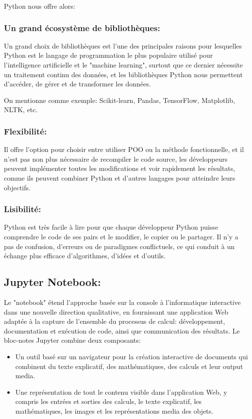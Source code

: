 Python nous offre alors:
\subsubsection{Un grand écosystème de bibliothèques:}
Un grand choix de bibliothèques est l'une des principales raisons pour lesquelles Python est le langage de programmation le plus populaire utilisé pour l'intelligence artificielle et le "machine learning", surtout que ce dernier nécessite un traitement continu des données, et les bibliothèques Python nous permettent d'accéder, de gérer et de transformer les données.

On mentionne comme exemple: Scikit-learn, Pandas, TensorFlow, Matplotlib, NLTK, etc.

\subsubsection{Flexibilité:}
Il offre l'option pour choisir entre utiliser POO ou la méthode fonctionnelle, et il n'est pas non plus nécessaire de recompiler le code source, les développeurs peuvent implémenter toutes les modifications et voir rapidement les résultats, comme ils peuvent combiner Python et d'autres langages pour atteindre leurs objectifs.

\subsubsection{Lisibilité:}
Python est très facile à lire pour que chaque développeur Python puisse comprendre le code de ses pairs et le modifier, le copier ou le partager. Il n'y a pas de confusion, d'erreurs ou de paradigmes conflictuels, ce qui conduit à un échange plus efficace d'algorithmes, d'idées et d'outils.

\subsection{Jupyter Notebook:}
Le "notebook" étend l'approche basée sur la console à l'informatique interactive dans une nouvelle direction qualitative, en fournissant une application Web adaptée à la capture de l'ensemble du processus de calcul: développement, documentation et exécution de code, ainsi que communication des résultats. Le bloc-notes Jupyter combine deux composants:
\begin{itemize}
    \item {} Un outil basé sur un navigateur pour la création interactive de documents qui combinent du texte explicatif, des mathématiques, des calculs et leur output media.
    \item {} Une représentation de tout le contenu visible dans l'application Web, y compris les entrées et sorties des calculs, le texte explicatif, les mathématiques, les images et les représentations media des objets.
\end{itemize}

